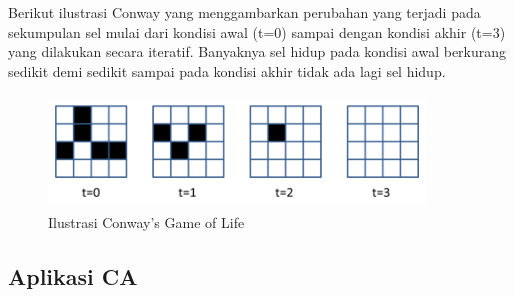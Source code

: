 \begin{enumerate}
			Berikut ilustrasi Conway yang menggambarkan perubahan yang terjadi pada sekumpulan sel mulai dari kondisi awal (t=0) sampai dengan kondisi akhir (t=3) yang dilakukan secara iteratif. Banyaknya sel hidup pada kondisi awal berkurang sedikit demi sedikit sampai pada kondisi akhir tidak ada lagi sel hidup. \cite{ECA}
			
			
			\begin{figure} [H]
					\centering  
					\includegraphics[width=10cm, height=3cm]{contohconway} 
					\caption[Ilustrasi Conway's Game of Life]{Ilustrasi Conway's Game of Life} 
					\label{fig:contohconway} 
				\end{figure}
			
\end{enumerate}		
\subsection{Aplikasi CA} 
		
